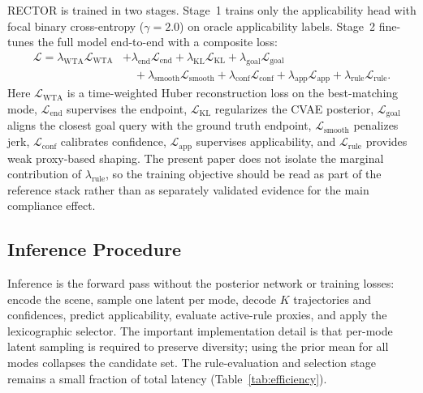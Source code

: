 RECTOR is trained in two stages. Stage~1 trains only the applicability head with focal binary cross-entropy ($\gamma{=}2.0$) on oracle applicability labels. Stage~2 fine-tunes the full model end-to-end with a composite loss:
\begin{align}
\mathcal{L}=
\lambda_{\text{WTA}}\mathcal{L}_{\text{WTA}}&+
\lambda_{\text{end}}\mathcal{L}_{\text{end}}+
\lambda_{\text{KL}}\mathcal{L}_{\text{KL}}+
\lambda_{\text{goal}}\mathcal{L}_{\text{goal}}\nonumber\\
&\quad+\lambda_{\text{smooth}}\mathcal{L}_{\text{smooth}}+
\lambda_{\text{conf}}\mathcal{L}_{\text{conf}}+
\lambda_{\text{app}}\mathcal{L}_{\text{app}}+
\lambda_{\text{rule}}\mathcal{L}_{\text{rule}}.
\end{align}
Here $\mathcal{L}_{\text{WTA}}$ is a time-weighted Huber reconstruction loss on the best-matching mode, $\mathcal{L}_{\text{end}}$ supervises the endpoint, $\mathcal{L}_{\text{KL}}$ regularizes the CVAE posterior, $\mathcal{L}_{\text{goal}}$ aligns the closest goal query with the ground truth endpoint, $\mathcal{L}_{\text{smooth}}$ penalizes jerk, $\mathcal{L}_{\text{conf}}$ calibrates confidence, $\mathcal{L}_{\text{app}}$ supervises applicability, and $\mathcal{L}_{\text{rule}}$ provides weak proxy-based shaping. The present paper does not isolate the marginal contribution of $\lambda_{\text{rule}}$, so the training objective should be read as part of the reference stack rather than as separately validated evidence for the main compliance effect.

\subsection{Inference Procedure}
\label{subsec:inference}

Inference is the forward pass without the posterior network or training losses: encode the scene, sample one latent per mode, decode $K$ trajectories and confidences, predict applicability, evaluate active-rule proxies, and apply the lexicographic selector. The important implementation detail is that per-mode latent sampling is required to preserve diversity; using the prior mean for all modes collapses the candidate set. The rule-evaluation and selection stage remains a small fraction of total latency (Table~\ref{tab:efficiency}).
